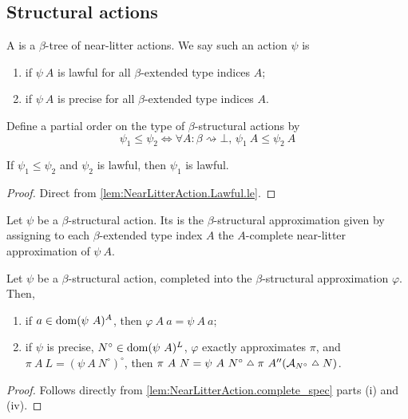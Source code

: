 \subsection{Structural actions}
\begin{definition}
    A  is a \( \beta \)-tree of near-litter actions.
    We say such an action \( \psi \) is
    \begin{enumerate}
        \item {} if \( \psi\ A \) is lawful for all \( \beta \)-extended type indices \( A \);
        \item {} if \( \psi\ A \) is precise for all \( \beta \)-extended type indices \( A \).
    \end{enumerate}
\end{definition}
\begin{definition}
    Define a partial order on the type of \( \beta \)-structural actions by
    \[ \psi_1 \leq \psi_2 \Leftrightarrow \forall A : \beta \rightsquigarrow \bot,\, \psi_1\ A \leq \psi_2\ A \]
\end{definition}
\begin{lemma}
    \label{lem:StructAction.Lawful.le}
    If \( \psi_1 \leq \psi_2 \) and \( \psi_2 \) is lawful, then \( \psi_1 \) is lawful.
\end{lemma}
\begin{proof}
    Direct from \cref{lem:NearLitterAction.Lawful.le}.
\end{proof}
\begin{definition}
    Let \( \psi \) be a \( \beta \)-structural action.
    Its  is the \( \beta \)-structural approximation given by assigning to each \( \beta \)-extended type index \( A \) the \( A \)-complete near-litter approximation of \( \psi\ A \).
\end{definition}
\begin{theorem}
    \label{lem:StructAction.complete_spec}
    Let \( \psi \) be a \( \beta \)-structural action, completed into the \( \beta \)-structural approximation \( \varphi \).
    Then,
    \begin{enumerate}
        \item if \( a \in \operatorname{dom} (\psi\ A)^A \), then \( \varphi\ A\ a = \psi\ A\ a \);
        \item if \( \psi \) is precise, \( N^\circ \in \dom (\psi\ A)^L \), \( \varphi \) exactly approximates \( \pi \), and \( \pi\ A\ L = (\psi\ A\ N^\circ)^\circ \), then \( \pi\ A\ N = \psi\ A\ N^\circ \symmdiff \pi\ A '' (\mathcal A_{N^\circ} \symmdiff N) \).
    \end{enumerate}
\end{theorem}
\begin{proof}
    Follows directly from \cref{lem:NearLitterAction.complete_spec} parts (i) and (iv).
\end{proof}
